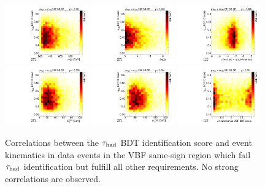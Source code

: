\begin{figure}[tp]
  \includegraphics[width=0.32\textwidth]{figures/tauidcorrelations/tauid_vs_mjj}
  \includegraphics[width=0.32\textwidth]{figures/tauidcorrelations/tauid_vs_detajj}
  \includegraphics[width=0.32\textwidth]{figures/tauidcorrelations/tauid_vs_etaprod}
  \includegraphics[width=0.32\textwidth]{figures/tauidcorrelations/tauid_vs_metet}
  \includegraphics[width=0.32\textwidth]{figures/tauidcorrelations/tauid_vs_Hpt}
  \includegraphics[width=0.32\textwidth]{figures/tauidcorrelations/tauid_vs_bdt}
  \caption{Correlations between the $\tau_\text{had}$ BDT identification score and event kinematics in data events in the VBF same-sign region which fail $\tau_\text{had}$ identification but fulfill all other requirements. No strong correlations are observed.}
  \label{fig:backgrounds-tauid-correlations}
\end{figure}

